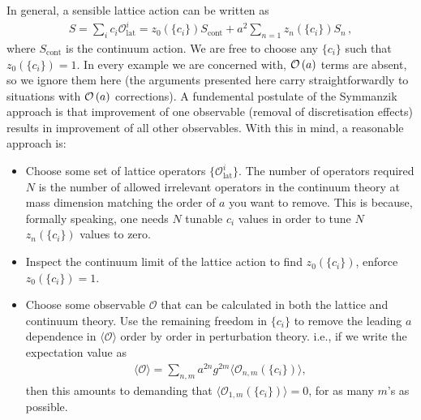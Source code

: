 In general, a sensible lattice action can be written as
\begin{align}
  S = \sum_{i} c_i \mathcal{O}^i_{\text{lat}} = z_0(\{c_i\}) S_{\text{cont}} + a^2 \sum_{n=1} z_n(\{c_i\}) S_n\,,
  \label{eq:continuum_limit_action}
\end{align}
where $S_{\text{cont}}$ is the continuum action. We are free to choose any $\{c_i\}$ such that $z_0(\{c_i\}) = 1$. In every example we are concerned with, $\mathcal{O}\left( a \right)$ terms are absent, so we ignore them here (the arguments presented here carry straightforwardly to situations with $\mathcal{O}\left( a \right)$ corrections). A fundemental postulate of the Symmanzik approach is that improvement of one observable (removal of discretisation effects) results in improvement of all other observables. With this in mind, a reasonable approach is:
\begin{itemize}
\item
  Choose some set of lattice operators $\{\mathcal{O}^i_{\text{lat}}\}$. The number of operators required $N$ is the number of allowed irrelevant operators in the continuum theory at mass dimension matching the order of $a$ you want to remove. This is because, formally speaking, one needs $N$ tunable $c_i$ values in order to tune $N$ $z_n(\{c_i\})$ values to zero.
\item
  Inspect the continuum limit of the lattice action to find $z_0(\{c_i\})$, enforce $z_0(\{c_i\})=1$.
\item
  Choose some observable $\mathcal{O}$ that can be calculated in both the lattice and continuum theory. Use the remaining freedom in $\{c_i\}$ to remove the leading $a$ dependence in $\langle \mathcal{O}\rangle$ order by order in perturbation theory. i.e., if we write the expectation value as
  \begin{align}
    \langle \mathcal{O} \rangle = \sum_{n,m} a^{2n} g^{2m}\langle \mathcal{O}_{n,m}(\{c_i\}) \rangle,
  \end{align}
  then this amounts to demanding that $\langle \mathcal{O}_{1,m}(\{c_i\})\rangle = 0$, for as many $m$'s as possible.
\end{itemize}

